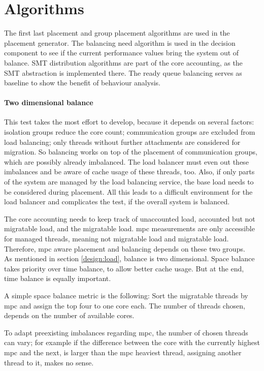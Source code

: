 \section{Algorithms}
\label{impl:algos}

The first last placement and group placement algorithms are used in the
placement generator.
The balancing need algorithm is used in the decision component to see if the
current performance values bring the system out of balance.
SMT distribution algorithms are part of the core accounting, as the SMT
abstraction is implemented there.
The ready queue balancing serves as baseline to show the benefit of behaviour
analysis.

\paragraph{Two dimensional balance}
This test takes the most effort to develop, because it depends on several
factors: isolation groups reduce the core count; communication groups are
excluded from load balancing; only threads without further attachments are
considered for migration.
So balancing works on top of the placement of communication groups, which are
possibly already imbalanced.
The load balancer must even out these imbalances and be aware of cache usage of
these threads, too.
Also, if only parts of the system are managed by the load balancing service,
the base load needs to be considered during placement.
All this leads to a difficult environment for the load balancer and complicates
the test, if the overall system is balanced.

The core accounting needs to keep track of unaccounted load, accounted but
not migratable load, and the migratable load.
\Gls{mpc} measurements are only accessible for managed threads, meaning not
migratable load and migratable load.
Therefore, \gls{mpc} aware placement and balancing depends on these two
groups.
\\

As mentioned in section \ref{design:load}, balance is two dimensional.
Space balance takes priority over time balance, to allow better cache usage.
But at the end, time balance is equally important.

A simple space balance metric is the following: Sort the migratable threads by
\gls{mpc} and assign the top four to one core each.
The number of threads chosen, depends on the number of available cores.

To adapt preexisting imbalances regarding \gls{mpc},  the number of chosen
threads can vary; for example if the difference between the core with the
currently highest \gls{mpc} and the next, is larger than the \gls{mpc} heaviest
thread, assigning another thread to it, makes no sense.

